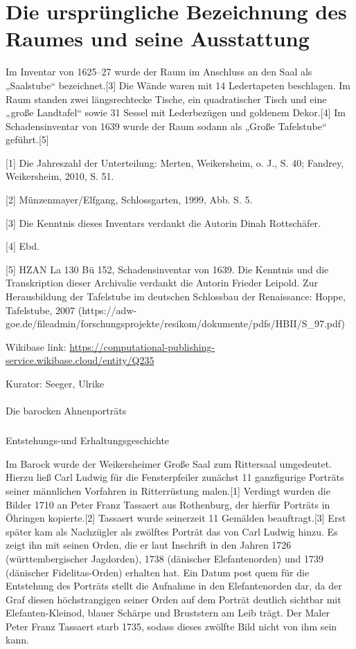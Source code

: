 \documentclass[
  letterpaper,
]{book}
\makeatletter
\let\oldparagraph\paragraph
\renewcommand{\paragraph}{
    \@ifstar
      \xxxParagraphStar
      \xxxParagraphNoStar
  }
\newcommand{\xxxParagraphStar}[1]{\oldparagraph*{#1}\mbox{}}
\newcommand{\xxxParagraphNoStar}[1]{\oldparagraph{#1}\mbox{}}
\let\oldsubparagraph\subparagraph
\renewcommand{\subparagraph}{
    \@ifstar
      \xxxSubParagraphStar
      \xxxSubParagraphNoStar
  }
\newcommand{\xxxSubParagraphStar}[1]{\oldsubparagraph*{#1}\mbox{}}
\newcommand{\xxxSubParagraphNoStar}[1]{\oldsubparagraph{#1}\mbox{}}
\makeatother
\begin{document}
\section{Die ursprüngliche Bezeichnung des Raumes und seine
Ausstattung}\label{die-urspruxfcngliche-bezeichnung-des-raumes-und-seine-ausstattung}

Im Inventar von 1625--27 wurde der Raum im Anschluss an den Saal als
„Saalstube`` bezeichnet.{[}3{]} Die Wände waren mit 14 Ledertapeten
beschlagen. Im Raum standen zwei längsrechtecke Tische, ein
quadratischer Tisch und eine „große Landtafel`` sowie 31 Sessel mit
Lederbezügen und goldenem Dekor.{[}4{]} Im Schadensinventar von 1639
wurde der Raum sodann als „Große Tafelstube`` geführt.{[}5{]}

{[}1{]} Die Jahreszahl der Unterteilung: Merten, Weikersheim, o. J., S.
40; Fandrey, Weikersheim, 2010, S. 51.

{[}2{]} Münzenmayer/Elfgang, Schlossgarten, 1999, Abb. S. 5.

{[}3{]} Die Kenntnis dieses Inventars verdankt die Autorin Dinah
Rottschäfer.

{[}4{]} Ebd.

{[}5{]} HZAN La 130 Bü 152, Schadensinventar von 1639. Die Kenntnis und
die Transkription dieser Archivalie verdankt die Autorin Frieder
Leipold. Zur Herausbildung der Tafelstube im deutschen Schlossbau der
Renaissance: Hoppe, Tafelstube, 2007
(https://adw-goe.de/fileadmin/forschungsprojekte/resikom/dokumente/pdfs/HBII/S\_97.pdf)

Wikibase link:
\url{https://computational-publishing-service.wikibase.cloud/entity/Q235}

Kurator: Seeger, Ulrike

\paragraph{Die barocken
Ahnenporträts}\label{die-barocken-ahnenportruxe4ts}

\subparagraph{Entstehungs-und
Erhaltungsgeschichte}\label{entstehungs-und-erhaltungsgeschichte}

Im Barock wurde der Weikersheimer Große Saal zum Rittersaal umgedeutet.
Hierzu ließ Carl Ludwig für die Fensterpfeiler zunächst 11 ganzfigurige
Porträts seiner männlichen Vorfahren in Ritterrüstung malen.{[}1{]}
Verdingt wurden die Bilder 1710 an Peter Franz Tassaert aus Rothenburg,
der hierfür Porträts in Öhringen kopierte.{[}2{]} Tassaert wurde
seinerzeit 11 Gemälden beauftragt.{[}3{]} Erst später kam als Nachzügler
als zwölftes Porträt das von Carl Ludwig hinzu. Es zeigt ihn mit seinen
Orden, die er laut Inschrift in den Jahren 1726 (württembergischer
Jagdorden), 1738 (dänischer Elefantenorden) und 1739 (dänischer
Fidelitas-Orden) erhalten hat. Ein Datum post quem für die Entstehung
des Porträts stellt die Aufnahme in den Elefantenorden dar, da der Graf
diesen höchstrangigen seiner Orden auf dem Porträt deutlich sichtbar mit
Elefanten-Kleinod, blauer Schärpe und Bruststern am Leib trägt. Der
Maler Peter Franz Tassaert starb 1735, sodass dieses zwölfte Bild nicht
von ihm sein kann.
\end{document}
